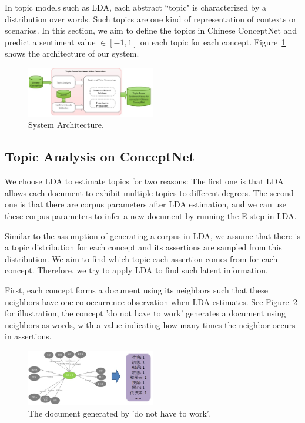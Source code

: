 In topic models such as LDA, each abstract ``topic" is characterized by a distribution over words. Such topics are one kind of representation of contexts or scenarios. In this section, we aim to define the topics in Chinese ConceptNet and predict a sentiment value $\in [-1,1]$ on each topic for each concept. Figure~\ref{fig:system1} shows the architecture of our system.

\begin{figure}[!t]
\centering
\includegraphics[width=0.5\textwidth]{fig/system1.jpg}
\caption{System Architecture.}
\label{fig:system1}
\end{figure}

\subsection{Topic Analysis on ConceptNet}
We choose LDA to estimate topics for two reasons: The first one is that LDA allows each document to exhibit multiple topics to different degrees. The second one is that there are corpus parameters after LDA estimation, and we can use these corpus parameters to infer a new document by running the E-step in LDA. 

Similar to the assumption of generating a corpus in LDA, we assume that there is a topic distribution for each concept and its assertions are sampled from this distribution. We aim to find which topic each assertion comes from for each concept. Therefore, we try to apply LDA to find such latent information. 

First, each concept forms a document using its neighbors such that these neighbors have one co-occurrence observation when LDA estimates. See Figure~\ref{fig:noWorkDoc} for illustration, the concept 'do not have to work' generates a document using neighbors as words, with a value indicating how many times the neighbor occurs in assertions.

\begin{figure}[!t]
\centering
\includegraphics[width=0.5\textwidth]{fig/noWorkDoc.jpg}
\caption{The document generated by 'do not have to work'.}
\label{fig:noWorkDoc}
\end{figure}

